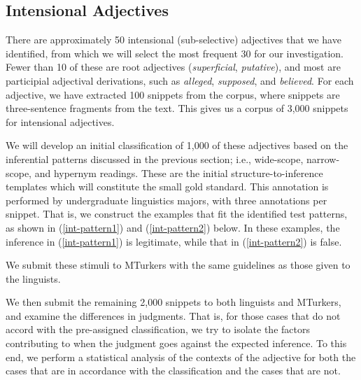 \documentclass[10pt]{article}
\begin{document}
\subsection{Intensional Adjectives}

There are approximately 50 intensional (sub-selective) adjectives that we have identified, from which we will select the most frequent 30 for our investigation. Fewer than 10 of these are root adjectives ({\it superficial}, {\it putative}), and most are participial adjectival derivations, such as {\it alleged}, {\it supposed}, and {\it believed}. For each adjective, we have extracted 100 snippets from the corpus, where snippets are three-sentence fragments from the text. This gives us a corpus of 3,000 snippets for intensional adjectives. 

We will develop an initial classification of 1,000 of these adjectives based on the inferential patterns discussed in the previous section; i.e., wide-scope, narrow-scope, and hypernym readings. 
These are the initial structure-to-inference templates which will constitute the small gold standard. This annotation is performed by undergraduate linguistics majors, with three annotations per snippet. 
That is, we construct the examples that fit the identified test patterns, as shown in (\ref{int-pattern1}) and (\ref{int-pattern2}) below. In these examples, the inference in (\ref{int-pattern1}) is legitimate, while that in (\ref{int-pattern2}) is false. 



 \noindent We submit these stimuli to MTurkers  with the same guidelines as those given to the linguists. 
 
 We then submit the remaining 2,000 snippets to both linguists and MTurkers, and examine the differences in judgments. That is, for those cases that do not accord with the pre-assigned classification, we try to isolate the factors contributing to when the judgment goes against the expected inference. 
 To this end, we perform a statistical analysis of the contexts of the adjective for both the cases that are in accordance with the classification and the cases that are not. 
 
\end{document}
